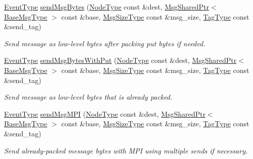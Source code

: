 \begin{DoxyCompactItemize}
\hyperlink{namespacevt_a009267401def7ae8bf201892222d060f}{Event\+Type} \hyperlink{structvt_1_1messaging_1_1_active_messenger_ab3542048b6c0f380899643b031eb1731}{send\+Msg\+Bytes} (\hyperlink{namespacevt_a866da9d0efc19c0a1ce79e9e492f47e2}{Node\+Type} const \&dest, \hyperlink{structvt_1_1messaging_1_1_msg_shared_ptr}{Msg\+Shared\+Ptr}$<$ \hyperlink{namespacevt_a44d0d4e144748f2b19a1cfd962f50338}{Base\+Msg\+Type} $>$ const \&base, \hyperlink{namespacevt_a408e86a8c7c89309b52907dc5a513924}{Msg\+Size\+Type} const \&msg\+\_\+size, \hyperlink{namespacevt_a84ab281dae04a52a4b243d6bf62d0e52}{Tag\+Type} const \&send\+\_\+tag)
\begin{DoxyCompactList}\small\item\em Send message as low-\/level bytes after packing put bytes if needed. \end{DoxyCompactList}\item 
\hyperlink{namespacevt_a009267401def7ae8bf201892222d060f}{Event\+Type} \hyperlink{structvt_1_1messaging_1_1_active_messenger_a46c03a8a4da878972eda8db2d3f1cc1d}{send\+Msg\+Bytes\+With\+Put} (\hyperlink{namespacevt_a866da9d0efc19c0a1ce79e9e492f47e2}{Node\+Type} const \&dest, \hyperlink{structvt_1_1messaging_1_1_msg_shared_ptr}{Msg\+Shared\+Ptr}$<$ \hyperlink{namespacevt_a44d0d4e144748f2b19a1cfd962f50338}{Base\+Msg\+Type} $>$ const \&base, \hyperlink{namespacevt_a408e86a8c7c89309b52907dc5a513924}{Msg\+Size\+Type} const \&msg\+\_\+size, \hyperlink{namespacevt_a84ab281dae04a52a4b243d6bf62d0e52}{Tag\+Type} const \&send\+\_\+tag)
\begin{DoxyCompactList}\small\item\em Send message as low-\/level bytes that is already packed. \end{DoxyCompactList}\item 
\hyperlink{namespacevt_a009267401def7ae8bf201892222d060f}{Event\+Type} \hyperlink{structvt_1_1messaging_1_1_active_messenger_ad1406c7f73624f030a0d74dd210ca9d6}{send\+Msg\+M\+PI} (\hyperlink{namespacevt_a866da9d0efc19c0a1ce79e9e492f47e2}{Node\+Type} const \&dest, \hyperlink{structvt_1_1messaging_1_1_msg_shared_ptr}{Msg\+Shared\+Ptr}$<$ \hyperlink{namespacevt_a44d0d4e144748f2b19a1cfd962f50338}{Base\+Msg\+Type} $>$ const \&base, \hyperlink{namespacevt_a408e86a8c7c89309b52907dc5a513924}{Msg\+Size\+Type} const \&msg\+\_\+size, \hyperlink{namespacevt_a84ab281dae04a52a4b243d6bf62d0e52}{Tag\+Type} const \&send\+\_\+tag)
\begin{DoxyCompactList}\small\item\em Send already-\/packed message bytes with M\+PI using multiple sends if necessary. \end{DoxyCompactList}\item 

\end{DoxyCompactItemize}
